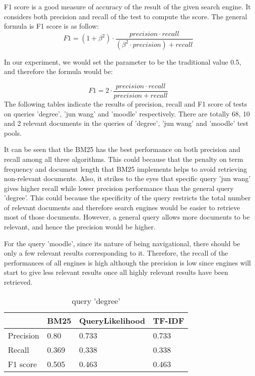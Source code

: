 F1 score is a good measure of accuracy of the result of the given search engine. It considers both precision and recall of the test to compute the score. The general formula is F1 score is as follow:
\[F1=(1+\beta^{2})\cdot \frac{precision\cdot recall}{(\beta^{2}\cdot precision)+recall}\]

In our experiment, we would set the parameter to be the traditional value 0.5, and therefore the formula would be:

\[F1=2\cdot \frac{precision \cdot recall}{precision+recall}\]
The following tables indicate the results of precision, recall and F1 score of tests on queries 'degree', 'jun wang' and 'moodle' respectively. There are totally 68, 10 and 2 relevant documents in the queries of 'degree', 'jun wang' and 'moodle' test pools. 

It can be seen that the BM25 has the best performance on both precision and recall among all three algorithms. This could because that the penalty on term frequency and document length that BM25 implements helps to avoid retrieving non-relevant documents. Also, it strikes to the eyes that specific query 'jun wang' gives higher recall while lower precision performance than the general query 'degree'. This could because the specificity of the query restricts the total number of relevant documents and therefore search engines would be easier to retrieve most of those documents. However, a general query allows more documents to be relevant, and hence the precision would be higher. 

For the query 'moodle', since its nature of being navigational, there should be only a few relevant results corresponding to it. Therefore, the recall of the performances of all engines is high although the precision is low since engines will start to give less relevant results once all highly relevant results have been retrieved.

\begin{table}[]
\centering
\caption{query 'degree'}
\label{my-label}
\begin{tabular}{|l|l|l|l|}
\hline
          & BM25  & QueryLikelihood & TF-IDF \\ \hline
Precision & 0.80  & 0.733           & 0.733  \\ \hline
Recall    & 0.369 & 0.338           & 0.338  \\ \hline
F1 score  & 0.505 & 0.463           & 0.463  \\ \hline
\end{tabular}
\end{table}

